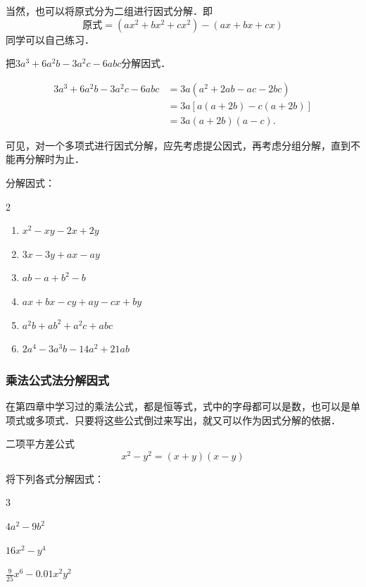 当然，也可以将原式分为二组进行因式分解．即
\[\text{原式}=(ax^2+bx^2+cx^2)-(ax+bx+cx)\]
同学可以自己练习．

\begin{example}
    把$3a^3+6a^2b-3a^2c -6abc$分解因式．
\end{example}

\begin{solution}
    \[\begin{split}
        3a^3+6a^2b-3a^2c -6abc&=3a (a^2+2ab-ac-2bc)\\
    &=3a [a (a+2b) -c (a+2b) ]\\
    &=3a (a+2b) (a-c).
    \end{split}\]       
\end{solution}

可见，对一个多项式进行因式分解，应先考虑提公因式，再考虑分组分解，直到不能再分解时为止．

\begin{ex}
 分解因式：
 \begin{multicols}{2}
 \begin{enumerate}
     \item $x^2-xy-2x+2y$
     \item $3x-3y+ax-ay$
     \item $ab-a+b^2-b$
     \item $ax+bx-cy+ay-cx+by$
     \item $a^2b+ab^2+a^2c+abc$
     \item $2a^4-3a^3b-14a^2+21ab$
 \end{enumerate}  
\end{multicols}
\end{ex}

\subsubsection{乘法公式法分解因式}

在第四章中学习过的乘法公式，都是恒等式，式中的字母都可以是数，也可以是单项式或多项式．只要将这些公式倒过来写出，就又可以作为因式分解的依据．

\begin{blk}{二项平方差公式}
    \[x^2-y^2=(x+y)(x-y)\]
\end{blk}

\begin{example}
    将下列各式分解因式：
\begin{enumerate}
    \begin{multicols}{3}
         \item $4a^2-9b^2$
         \item $16x^2-y^4$
         \item $\frac{9}{25}x^6-0.01 x^2y^2$
    \end{multicols}
\end{enumerate}
\end{example}

